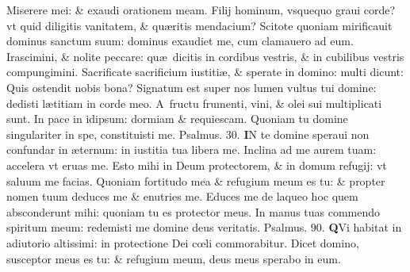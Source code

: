 \documentclass[a5paper,10pt]{book}
\def\ae{æ}
\def\oe{œ}
\begin{document}
\begin{multicols*}{2}
\newline \color{red} M\color{black}iserere mei: \& exaudi orationem meam.
\newline \color{red} F\color{black}ilij hominum, vsquequo graui corde? vt quid diligitis vanitatem, \& qu\ae ritis mendacium?
\newline \color{red} S\color{black}citote quoniam mirificauit dominus sanctum suum: dominus exaudiet me, cum clamauero ad eum.
\newline \color{red} I\color{black}rascimini, \& nolite peccare: qu\ae \ dicitis in cordibus vestris, \& in cubilibus vestris compungimini.
\newline \color{red} S\color{black}acrificate sacrificium iustiti\ae , \& sperate in domino: multi dicunt: Quis ostendit nobis bona?
\newline \color{red} S\color{black}ignatum est super nos lumen vultus tui domine: dedisti l\ae titiam in corde meo.
\newline \color{red} A\color{black}\ fructu frumenti, vini, \& olei sui multiplicati sunt.
\newline \color{red} I\color{black}n pace in idipsum: dormiam \& requiescam.
\newline \color{red} Q\color{black}uoniam tu domine singulariter in spe, constituisti me. \quad \color{red} Psalmus. \hypertarget{ps30.1}{30.} \color{black}
\lettrine[lines=2]{\bfseries \color{red} I}{}N te domine speraui non confundar in \ae ternum: in iustitia tua libera me.
\newline \color{red} I\color{black}nclina ad me aurem tuam: accelera vt eruas me.
\newline \color{red} E\color{black}sto mihi in Deum protectorem, \& in domum refugij: vt saluum me facias.
\newline \color{red} Q\color{black}uoniam fortitudo mea \& refugium meum es tu: \& propter nomen tuum deduces me \& enutries me.
\newline \color{red} E\color{black}duces me de laqueo hoc quem absconderunt mihi: quoniam tu es protector meus.
\newline \color{red} I\color{black}n manus tuas commendo spiritum meum: redemisti me domine deus veritatis. \quad \color{red} Psalmus. \hypertarget{ps90}{90.} \color{black}
\lettrine[lines=2]{\bfseries \color{red} Q}{}Vi habitat in adiutorio altissimi: in protectione Dei c\oe li commorabitur.
\newline \color{red} D\color{black}icet domino, susceptor meus es tu: \& refugium meum, deus meus sperabo in eum.

\end{multicols*}
\end{document}
